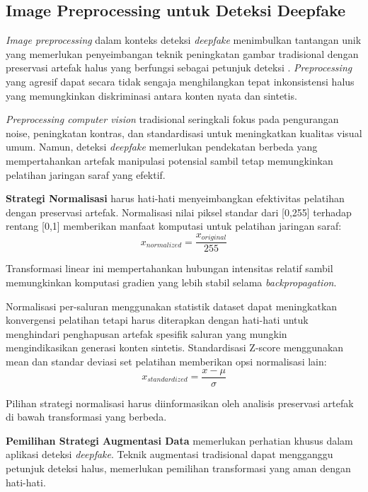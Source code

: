 \subsection{Image Preprocessing untuk Deteksi Deepfake}

\textit{Image preprocessing} dalam konteks deteksi \textit{deepfake} menimbulkan tantangan unik yang memerlukan penyeimbangan teknik peningkatan gambar tradisional dengan preservasi artefak halus yang berfungsi sebagai petunjuk deteksi \cite{li2020celeb}. \textit{Preprocessing} yang agresif dapat secara tidak sengaja menghilangkan tepat inkonsistensi halus yang memungkinkan diskriminasi antara konten nyata dan sintetis.

\textit{Preprocessing computer vision} tradisional seringkali fokus pada pengurangan noise, peningkatan kontras, dan standardisasi untuk meningkatkan kualitas visual umum. Namun, deteksi \textit{deepfake} memerlukan pendekatan berbeda yang mempertahankan artefak manipulasi potensial sambil tetap memungkinkan pelatihan jaringan saraf yang efektif.

\textbf{Strategi Normalisasi} harus hati-hati menyeimbangkan efektivitas pelatihan dengan preservasi artefak. Normalisasi nilai piksel standar dari [0,255] terhadap rentang [0,1] memberikan manfaat komputasi untuk pelatihan jaringan saraf:
\begin{equation}
x_{normalized} = \frac{x_{original}}{255}
\label{eq:pixel_normalization}
\end{equation}

Transformasi linear ini mempertahankan hubungan intensitas relatif sambil memungkinkan komputasi gradien yang lebih stabil selama \textit{backpropagation}.

Normalisasi per-saluran menggunakan statistik dataset dapat meningkatkan konvergensi pelatihan tetapi harus diterapkan dengan hati-hati untuk menghindari penghapusan artefak spesifik saluran yang mungkin mengindikasikan generasi konten sintetis. Standardisasi Z-score menggunakan mean dan standar deviasi set pelatihan memberikan opsi normalisasi lain:
\begin{equation}
x_{standardized} = \frac{x - \mu}{\sigma}
\label{eq:zscore_standardization}
\end{equation}

Pilihan strategi normalisasi harus diinformasikan oleh analisis preservasi artefak di bawah transformasi yang berbeda.

\textbf{Pemilihan Strategi Augmentasi Data} memerlukan perhatian khusus dalam aplikasi deteksi \textit{deepfake}. Teknik augmentasi tradisional dapat mengganggu petunjuk deteksi halus, memerlukan pemilihan transformasi yang aman dengan hati-hati.

